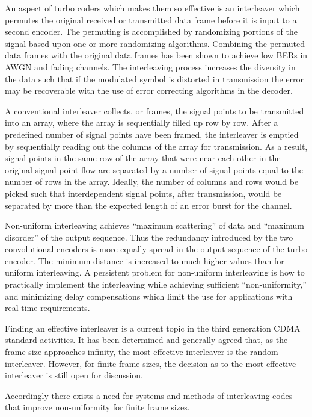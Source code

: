 \documentclass[11pt,a4paper]{article}
\begin{document}
An aspect of turbo coders which makes them so effective is an interleaver which permutes the original received or transmitted data frame before it is input to a second encoder. The permuting is accomplished by randomizing portions of the signal based upon one or more randomizing algorithms. Combining the permuted data frames with the original data frames has been shown to achieve low BERs in AWGN and fading channels. The interleaving process increases the diversity in the data such that if the modulated symbol is distorted in transmission the error may be recoverable with the use of error correcting algorithms in the decoder.

A conventional interleaver collects, or frames, the signal points to be transmitted into an array, where the array is sequentially filled up row by row. After a predefined number of signal points have been framed, the interleaver is emptied by sequentially reading out the columns of the array for transmission. As a result, signal points in the same row of the array that were near each other in the original signal point flow are separated by a number of signal points equal to the number of rows in the array. Ideally, the number of columns and rows would be picked such that interdependent signal points, after transmission, would be separated by more than the expected length of an error burst for the channel.

Non-uniform interleaving achieves “maximum scattering” of data and “maximum disorder” of the output sequence. Thus the redundancy introduced by the two convolutional encoders is more equally spread in the output sequence of the turbo encoder. The minimum distance is increased to much higher values than for uniform interleaving. A persistent problem for non-uniform interleaving is how to practically implement the interleaving while achieving sufficient “non-uniformity,” and minimizing delay compensations which limit the use for applications with real-time requirements.

Finding an effective interleaver is a current topic in the third generation CDMA standard activities. It has been determined and generally agreed that, as the frame size approaches infinity, the most effective interleaver is the random interleaver. However, for finite frame sizes, the decision as to the most effective interleaver is still open for discussion.

Accordingly there exists a need for systems and methods of interleaving codes that improve non-uniformity for finite frame sizes.
\end{document}
